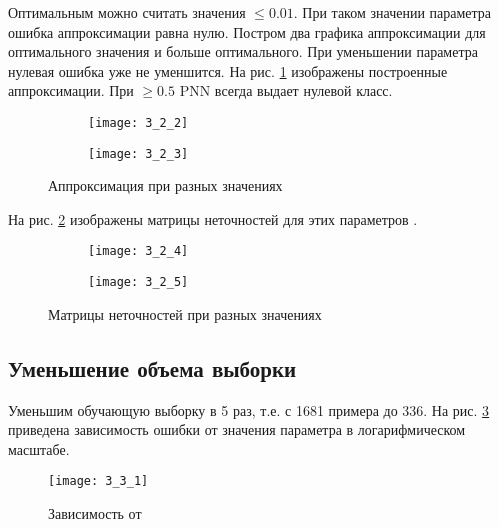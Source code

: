 Оптимальным можно считать значения  $\leq 0.01$. При таком значении параметра ошибка аппроксимации равна нулю. Постром два графика аппроксимации для оптимального значения  и больше оптимального. При уменьшении параметра нулевая ошибка уже не уменшится. На рис. \ref{fig:3_2_2} изображены построенные аппроксимации. При  $\geq 0.5$ PNN всегда выдает нулевой класс.
\begin{figure}[H]
\begin{center}
	\begin{subfigure}{0.49\textwidth}
		\texttt{[image: 3\_2\_2]}
		\caption{}
	\end{subfigure}
	\begin{subfigure}{0.49\textwidth}
		\texttt{[image: 3\_2\_3]}
		\caption{}
	\end{subfigure}
	\caption{Аппроксимация при разных значениях }
	\label{fig:3_2_2}
\end{center}
\end{figure}

На рис. \ref{fig:3_2_3} изображены матрицы неточностей для этих параметров .
\begin{figure}[H]
\begin{center}
	\begin{subfigure}{0.49\textwidth}
		\texttt{[image: 3\_2\_4]}
		\caption{}
	\end{subfigure}
	\begin{subfigure}{0.49\textwidth}
		\texttt{[image: 3\_2\_5]}
		\caption{}
	\end{subfigure}
	\caption{Матрицы неточностей при разных значениях }
	\label{fig:3_2_3}
\end{center}
\end{figure}

\subsection{Уменьшение объема выборки}


Уменьшим обучающую выборку в 5 раз, т.е. с 1681 примера до 336. На рис. \ref{fig:3_3_1} приведена зависимость ошибки  от значения параметра  в логарифмическом масштабе. 
\begin{figure}[H]
\begin{center}
	\texttt{[image: 3\_3\_1]}
	\caption{Зависимость  от }
	\label{fig:3_3_1}
\end{center}
\end{figure}

